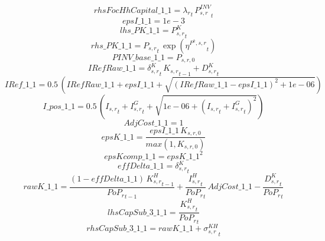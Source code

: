 \begin{dmath*}
rhsFocHhCapital\_1\_1 = {\lambda_r}_{t}\, {{P^{INV}_{s,r}}}_{t}
\end{dmath*}
\begin{dmath*}
epsI\_1\_1 = 1e-3
\end{dmath*}
\begin{dmath*}
lhs\_PK\_1\_1 = {{P^K_{s,r}}}_{t}
\end{dmath*}
\begin{dmath*}
rhs\_PK\_1\_1 = {{P_{s,r}}}_{t}\, \exp\left({{\eta^{P^k,s,r}}}_{t}\right)
\end{dmath*}
\begin{dmath*}
PINV\_base\_1\_1 = {{P_{s,r,0}}}
\end{dmath*}
\begin{dmath*}
IRefRaw\_1\_1 = {{\delta^{K}_{s,r}}}_{t}\, {{K_{s,r}}}_{t-1}+{{D^K_{s,r}}}_{t}
\end{dmath*}
\begin{dmath*}
IRef\_1\_1 = 0.5\, \left({IRefRaw\_1\_1}+{epsI\_1\_1}+\sqrt{\left({IRefRaw\_1\_1}-{epsI\_1\_1}\right)^{2}+1e-06}\right)
\end{dmath*}
\begin{dmath*}
I\_pos\_1\_1 = 0.5\, \left({{I_{s,r}}}_{t}+{{I^G_{s,r}}}_{t}+\sqrt{1e-06+\left({{I_{s,r}}}_{t}+{{I^G_{s,r}}}_{t}\right)^{2}}\right)
\end{dmath*}
\begin{dmath*}
AdjCost\_1\_1 = 1
\end{dmath*}
\begin{dmath*}
epsK\_1\_1 = \frac{{epsI\_1\_1}\, {{K_{s,r,0}}}}{max(1,{{K_{s,r,0}}})}
\end{dmath*}
\begin{dmath*}
epsKcomp\_1\_1 = {epsK\_1\_1}^{2}
\end{dmath*}
\begin{dmath*}
effDelta\_1\_1 = {{\delta^{K}_{s,r}}}_{t}
\end{dmath*}
\begin{dmath*}
rawK\_1\_1 = \frac{\left(1-{effDelta\_1\_1}\right)\, {{K^H_{s,r}}}_{t-1}}{{{PoP_r}}_{t-1}}+\frac{{{I^H_{s,r}}}_{t}}{{{PoP_r}}_{t}}\, {AdjCost\_1\_1}-\frac{{{D^K_{s,r}}}_{t}}{{{PoP_r}}_{t}}
\end{dmath*}
\begin{dmath*}
lhsCapSub\_3\_1\_1 = \frac{{{K^H_{s,r}}}_{t}}{{{PoP_r}}_{t}}
\end{dmath*}
\begin{dmath*}
rhsCapSub\_3\_1\_1 = {rawK\_1\_1}+{{\sigma^{KH}_{s,r}}}_{t}
\end{dmath*}
